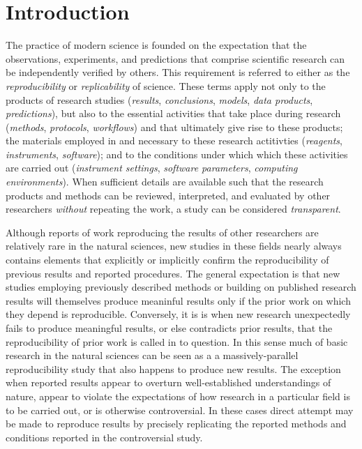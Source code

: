 \section{Introduction}

The practice of modern science is founded on the expectation that the observations, experiments, and
	predictions that comprise scientific research can be independently verified by others.
This requirement is referred to either as the \emph{reproducibility} or \emph{replicability} of 
	science.
These terms apply not only to the products of research studies (\emph{results}, 
	\emph{conclusions}, \emph{models}, \emph{data products}, \emph{predictions}), but also to the 
	essential activities that take place during research (\emph{methods}, \emph{protocols}, \emph{workflows}) 
	and that ultimately give rise to these products; the materials employed in and necessary to these 
	research actitivties (\emph{reagents}, \emph{instruments}, \emph{software}); and to the conditions under which 
	which these activities are carried out (\emph{instrument settings}, \emph{software parameters},
	\emph{computing environments}).  When sufficient details are available
	such that the research products and methods can be reviewed, interpreted, and
	evaluated by other researchers \emph{without} repeating the work, a study can be 
	considered \emph{transparent}.

Although reports of work reproducing the results of other researchers are relatively rare in the natural
	sciences, new studies in these fields nearly always contains elements that explicitly or implicitly 
	confirm the reproducibility of previous results and reported procedures.
The general expectation is that new studies employing previously described methods or building 
	on published research results will themselves produce meaninful results only if the prior work 
	on which they depend is reproducible.
Conversely, it is is when new research unexpectedly fails to produce meaningful results, or else contradicts
	prior results, that the reproducibility of prior work is called in to question.
In this sense much of basic research in the natural sciences can be seen as a  
	a massively-parallel reproducibility study that also happens to produce new results.
The exception when reported results appear to overturn well-established understandings of nature,
	appear to violate the expectations of how research in a particular field is to be carried out,
	or is otherwise controversial.
In these cases direct attempt may be made to reproduce results by precisely replicating the reported methods
	and conditions reported in the controversial study.
	

